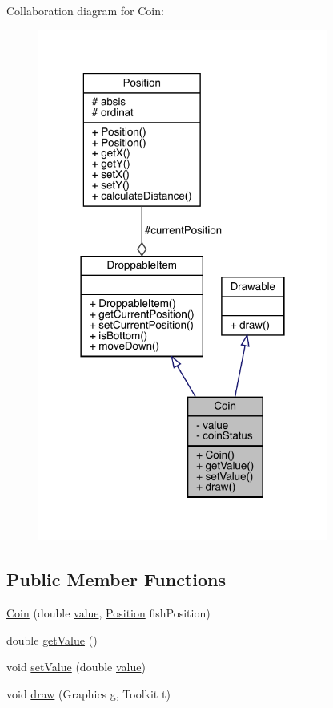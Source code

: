 Collaboration diagram for Coin\+:
\nopagebreak
\begin{figure}[H]
\begin{center}
\leavevmode
\includegraphics[width=270pt]{class_coin__coll__graph}
\end{center}
\end{figure}
\subsection*{Public Member Functions}
\begin{DoxyCompactItemize}
\item 
\mbox{\hyperlink{class_coin_ac75958fbac44671f534e83cde5df013b}{Coin}} (double \mbox{\hyperlink{class_coin_a1f18db679edab240c514b9a4dc47ec97}{value}}, \mbox{\hyperlink{class_position}{Position}} fish\+Position)
\item 
double \mbox{\hyperlink{class_coin_a420e22e4740d8836be0beb3678bc6fe0}{get\+Value}} ()
\item 
void \mbox{\hyperlink{class_coin_a4f3abfae192ec4fdf21389f41f799c5d}{set\+Value}} (double \mbox{\hyperlink{class_coin_a1f18db679edab240c514b9a4dc47ec97}{value}})
\item 
void \mbox{\hyperlink{class_coin_ae0c35ffd80b39f26f43d287da0565d0b}{draw}} (Graphics g, Toolkit t)
\end{DoxyCompactItemize}
